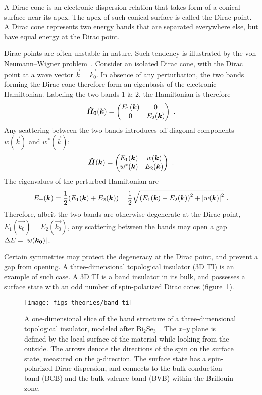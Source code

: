 ﻿A Dirac cone is an electronic dispersion relation that takes form of a conical surface near its apex. The apex of such conical surface is called the Dirac point. A Dirac cone represents two energy bands that are separated everywhere else, but have equal energy at the Dirac point.

Dirac points are often unstable in nature. Such tendency is illustrated by the von Neumann--Wigner problem~\cite{vonNeumann1993, Asano2011}. Consider an isolated Dirac cone, with the Dirac point at a wave vector $\vec{k}=\vec{k_0}$. In absence of any perturbation, the two bands forming the Dirac cone therefore form an eigenbasis of the electronic Hamiltonian. Labeling the two bands 1 \& 2, the Hamiltonian is therefore%
\begin{equation}
    \op{H_0}(\vec{k}) = %
        \begin{pmatrix}
            E_1(\vec{k}) & 0\\
            0 & E_2(\vec{k})
        \end{pmatrix}~.
\end{equation}%
Any scattering between the two bands introduces off diagonal components $w(\vec{k})$ and $w^*(\vec{k})$:%
\begin{equation}
    \op{H}(\vec{k}) = %
        \begin{pmatrix}
            E_1(\vec{k}) & w(\vec{k})\\
            w^*(\vec{k}) & E_2(\vec{k})
        \end{pmatrix}~.
\end{equation}%
The eigenvalues of the perturbed Hamiltonian are
\begin{equation}
    E_\pm(\vec{k}) = \frac{1}{2} \qty(E_1(\vec{k}) + E_2(\vec{k})) \pm \frac{1}{2} \sqrt{\qty(E_1(\vec{k}) - E_2(\vec{k}))^2 + \abs{w(\vec{k})}^2}~.
\end{equation}
Therefore, albeit the two bands are otherwise degenerate at the Dirac point, $E_1(\vec{k_0}) = E_2(\vec{k_0})$, any scattering between the bands may open a gap $\Delta{}E = \abs{w(\vec{k_0})}$.

Certain symmetries may protect the degeneracy at the Dirac point, and prevent a gap from opening. A three-dimensional topological insulator (3D TI) is an example of such case. A 3D TI is a band insulator in its bulk, and possesses a surface state with an odd number of spin-polarized Dirac cones (figure~\ref{fig:bg_ti}).%
\begin{figure}[ht]%
    \centering%
    \texttt{[image: figs\_theories/band\_ti]}%
    \caption[Band structure of a 3D topological insulator]{\label{fig:bg_ti}A one-dimensional slice of the band structure of a three-dimensional topological insulator, modeled after Bi$_2$Se$_3$~\cite{TI_Qi}. The $x$--$y$ plane is defined by the local surface of the material while looking from the outside. The arrows denote the directions of the spin on the surface state, measured on the $y$-direction. The surface state has a spin-polarized Dirac dispersion, and connects to the bulk conduction band (BCB) and the bulk valence band (BVB) within the Brillouin zone.}%
\end{figure}%


